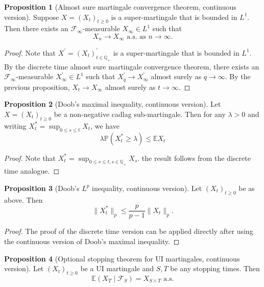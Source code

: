 \documentclass[parskip=full]{article}
\theoremstyle{definition}
\newtheorem{proposition}{Proposition}[section]
\newcommand{\Q}{\mathbb{Q}}
\newcommand{\Pbb}{\mathbb{P}}
\newcommand{\1}{\mathbbm{1}}
\newcommand{\E}{\mathbb{E}}
\begin{document}
\begin{proposition}[Almost sure martingale convergence theorem, continuous version]
  Suppose $X = (X_t)_{t \geq 0}$ is a super-martingale that is bounded in $L^1$. Then there exists an $\mathcal{F}_\infty$-measurable $X_\infty \in L^1$ such that
  \[
    X_n \to X_\infty\text{ a.s. as }n \to \infty.
  \]
\end{proposition}

\begin{proof}
  Note that $X^\prime = (X_t)_{t \in \Q_+}^\prime$ is a super-martingale that is bounded in $L^1$. By the discrete time almost sure martingale convergence theorem, there exists an $\mathcal{F}_\infty$-measurable $X_\infty^\prime \in L^1$ such that $X_q^\prime \to X_\infty^\prime$ almost surely as $q \to \infty$. By the previous proposition, $X_t \to X_\infty$ almost surely as $t \to \infty$.
\end{proof}

\begin{proposition}[Doob's maximal inequality, continuous version]
  Let $X = (X_t)_{t \geq 0}$ be a non-negative cadlag sub-martingale. Then for any $\lambda > 0$ and writing $X^*_t = \sup_{0 \leq s \leq t} X_t$, we have
  \[
    \lambda \Pbb(X^*_t \geq \lambda) \leq \E X_t
  \]
\end{proposition}

\begin{proof}
  Note that $X^*_t = \sup_{0 \leq s \leq t, s \in \Q_+} X_s$. the result follows from the discrete time analogue.
\end{proof}

\begin{proposition}[Doob's $L^p$ inequality, continuous version]
  Let $(X_t)_{t \geq 0}$ be as above. Then
  \[
    \|X_t^*\|_p \leq \frac{p}{p - 1} \|X_t\|_p.
  \]
\end{proposition}

\begin{proof}
  The proof of the discrete time version can be applied directly after using the continuous version of Doob's maximal inequality.
\end{proof}

\begin{proposition}[Optional stopping theorem for UI martingales, continuous version]
  Let $(X_t)_{t \geq 0}$ be a UI martingale and $S, T$ be any stopping times. Then
  \[
    \E(X_T \mid \mathcal{F}_S) = X_{S \wedge T} \text{ a.s.}
  \] 
\end{proposition}
\end{document}
